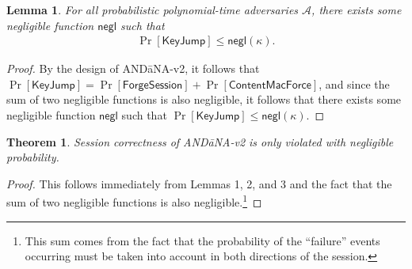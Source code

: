\documentclass[10pt]{article}
\newtheorem{thm}{\textbf{Theorem}}
\newtheorem{lemma}{\textbf{Lemma}}
\begin{document}
\begin{lemma}
For all probabilistic polynomial-time adversaries $\mathcal{A}$, there exists some negligible function $\mathsf{negl}$ such that
\begin{align*}
\Pr[\mathsf{KeyJump}] \leq \mathsf{negl}(\kappa).
\end{align*}
\end{lemma}
\begin{proof}
By the design of {\sf AND\=aNA-v2}, it follows that $\Pr[\mathsf{KeyJump}] = \Pr[\mathsf{ForgeSession}] + \Pr[\mathsf{ContentMacForce}]$, and since the sum of two negligible functions is also negligible, it follows that there exists some negligible function $\mathsf{negl}$ such that $\Pr[\mathsf{KeyJump}] \leq \mathsf{negl}(\kappa)$.
\end{proof}

\begin{thm}
Session correctness of {\sf AND\=aNA-v2} is only violated with negligible probability.
\end{thm}
\begin{proof}
This follows immediately from Lemmas 1, 2, and 3 and the fact that the sum of two negligible functions is also negligible.\footnote{This sum comes from the fact that the probability of the ``failure'' events occurring must be taken into account in both directions of the session.} 
\end{proof}




\end{document}
